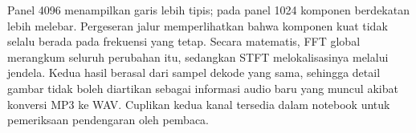 Panel 4096 menampilkan garis lebih tipis; pada panel 1024 komponen
berdekatan lebih melebar. Pergeseran jalur memperlihatkan bahwa
komponen kuat tidak selalu berada pada frekuensi yang tetap.
Secara matematis, FFT global merangkum seluruh perubahan itu,
sedangkan STFT melokalisasinya melalui jendela. Kedua hasil berasal
dari sampel dekode yang sama, sehingga detail gambar tidak boleh
diartikan sebagai informasi audio baru yang muncul akibat konversi
MP3 ke WAV. Cuplikan kedua kanal tersedia dalam notebook untuk
pemeriksaan pendengaran oleh pembaca.
